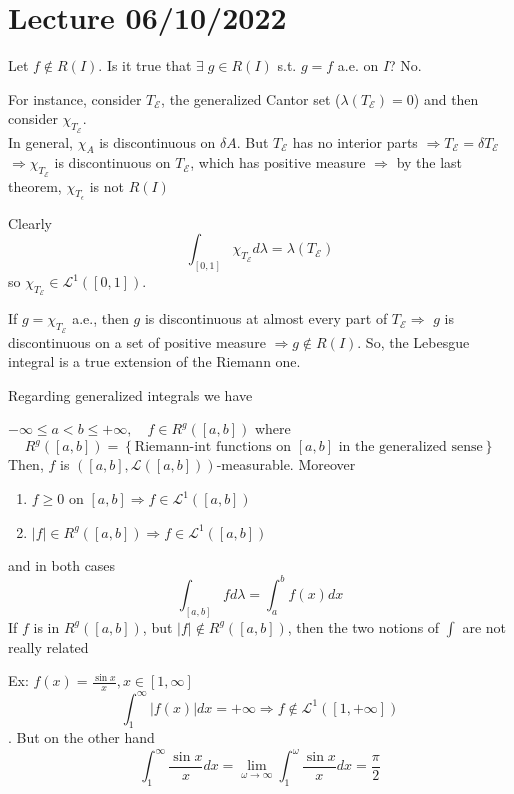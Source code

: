 \section{Lecture 06/10/2022}
Let \(f \not \in R(I)\). Is it true that \(\exists \; g \in R(I)\) s.t. \(g = f\) a.e. on \(I\)? No.

For instance, consider \(T_{\mathcal{E}}\), the generalized Cantor set (\(\lambda(T_{\mathcal{E}}) = 0\)) and then consider \(\chi_{T_{\mathcal{E}}}\). \\
In general, \(\chi_{A}\) is discontinuous on \(\delta A\).  But \(T_{\mathcal{E}}\) has no interior parts \(\Rightarrow T_{\mathcal{E}} = \delta T_{\mathcal{E}}\) \(\Rightarrow \chi_{T_{\mathcal{E}}}\) is discontinuous on \(T_{\mathcal{E}}\), which has positive measure
\(\Rightarrow \) by the last theorem, \(\chi_{T_\epsilon}\) is not \(R(I)\)

Clearly 
\[
    \int_{[0,1]} \chi_{T_{\mathcal{E}}} d\lambda = \lambda(T_{\mathcal{E}})
\]
so \(\chi_{T_{\mathcal{E}}} \in \mathcal{L}^1([0,1])\).  

If \(g = \chi_{T_{\mathcal{E}}}\) a.e., then \(g\) is discontinuous at almost every part of \(T_{\mathcal{E}} \Rightarrow\) \(g\) is discontinuous on a set of positive measure \(\Rightarrow g \not \in R(I)\). 
So, the Lebesgue integral is a true extension of the Riemann one.

Regarding generalized integrals we have

\begin{theorem}
    \(-\infty \leq a < b \leq +\infty, \quad f \in R^g([a,b])\) where 
    \[
        R^g([a,b]) = \left\lbrace \mbox{Riemann-int functions on }[a,b]\mbox{ in the generalized sense} \right\rbrace
    \]
    Then, \(f\) is \(([a,b], \mathcal{L}([a,b]))\)-measurable. Moreover
    \begin{enumerate}
        \item \(f \geq 0\) on \([a,b] \Rightarrow f \in \mathcal{L}^1([a,b])\)
        \item \(\vert f \vert \in R^g([a,b]) \Rightarrow f \in \mathcal{L}^1 ([a,b])\)
    \end{enumerate}
    and in both cases
    \[
        \int_{[a,b]} fd\lambda = \int_a^b f(x)dx
    \]
    If \(f\) is in \(R^g([a,b])\), but \(\vert f\vert \not \in R^g([a,b])\), then the two notions of \(\int\) are not really related
\end{theorem}

Ex:
\(f(x) = \frac{\sin x}{x},  x \in [1, \infty]\)
\[\int_1^{\infty} \vert f(x) \vert dx = +\infty \Rightarrow f \not \in \mathcal{L}^1([1, +\infty])\].
But on the other hand
\[
    \int_1^{\infty} \frac{\sin x}{x} dx = \lim_{\omega \to \infty} \int_1^{\omega} \frac{\sin x}{x} dx = \frac{\pi}{2}
\]

